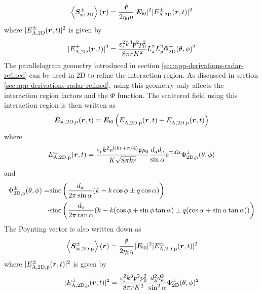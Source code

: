 \documentclass[11pt,twoside]{eitExjobb}
\begin{document}
	\begin{equation*}
		\left< \bm{S}_{\mathrm{sc,2D}}^\pm \right> (\bm{r}) = \frac{\bm{\hat{r}}}{2\eta_0 \eta} |\bm{E}_{\mathrm{i}0}|^2 |E_{\mathrm{A,2D}}^\pm (\bm{r},t)|^2
	\end{equation*}
	where $|E_{\mathrm{A,2D}}^\pm (\bm{r},t)|^2$ is given by
	\begin{equation*}
		|E_{\mathrm{A,2D}}^\pm (\bm{r},t)|^2 = \frac{\varepsilon_{\mathrm{r}}^2 k^3 \mathfrak{p}^2 p_0^2}{8\pi r K^2} L_{x}^2 L_{y}^2 \Phi_{\mathrm{2D}}^\pm (\theta,\phi)^2
	\end{equation*}
	The parallelogram geometry introduced in section \ref{sec:app-derivations-radar-refined} can be used in 2D to refine the interaction region. As discussed in section \ref{sec:app-derivations-radar-refined}, using this geometry only affects the interaction region factors and the $\Phi$ function. The scattered field using this interaction region is then written as
	\begin{equation*}
		\bm{E}_{\mathrm{sc,2D,p}} (\bm{r},t) = \bm{E}_{\mathrm{i}0} \left( E_{\mathrm{A,2D,p}}^+ (\bm{r},t) + E_{\mathrm{A,2D,p}}^- (\bm{r},t) \right)
	\end{equation*}
	where
	\begin{equation*}
		E_{\mathrm{A,2D,p}}^\pm (\bm{r},t) = \frac{\varepsilon_{\mathrm{r}}k^2 \mathrm{e}^{\mathrm{i} (kr + \pi/4)} \mathfrak{p} p_0}{K \sqrt{8\pi kr}} \frac{d_{\mathrm{a}} d_{\mathrm{e}}}{\sin{\alpha}} e^{\mp \mathrm{i} \Omega t} \Phi_{\mathrm{2D,p}}^\pm (\theta,\phi)
	\end{equation*}
	and
	\begin{equation*}
	\begin{split}
		\Phi_{\mathrm{2D,p}}^\pm (\theta,\phi) = &\text{sinc}\left( \frac{d_{\mathrm{a}}}{2\pi \sin{\alpha}}(k - k\cos{\phi} \pm q\cos{\alpha}) \right) \\
		\cdot &\text{sinc}\left( \frac{d_{\mathrm{e}}}{2\pi \tan{\alpha}}
		(k - k(\cos{\phi} + \sin{\phi}\tan{\alpha}) \pm q(\cos{\alpha} + \sin{\alpha}\tan{\alpha})) \right)
	\end{split}
	\end{equation*}
	The Poynting vector is also written down as
	\begin{equation*}
		\left< \bm{S}_{\mathrm{sc,2D,p}}^\pm \right> (\bm{r}) = \frac{\bm{\hat{r}}}{2\eta_0 \eta} |\bm{E}_{\mathrm{i}0}|^2 |E_{\mathrm{A,2D,p}}^\pm (\bm{r},t)|^2
	\end{equation*}
	where $|E_{\mathrm{A,2D,p}}^\pm (\bm{r},t)|^2$ is given by
	\begin{equation*}
		|E_{\mathrm{A,2D,p}}^\pm (\bm{r},t)|^2 = \frac{\varepsilon_{\mathrm{r}}^2 k^3 \mathfrak{p}^2 p_0^2}{8\pi r K^2} \frac{d_{\mathrm{a}}^2 d_{\mathrm{e}}^2}{\sin^2{\alpha}} \Phi_{\mathrm{2D}}^\pm (\theta,\phi)^2
	\end{equation*}
	
\end{document}
